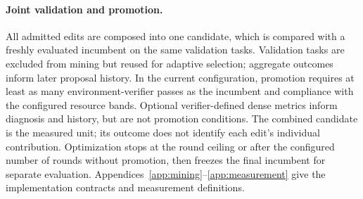 \paragraph{Joint validation and promotion.}
All admitted edits are composed into one candidate, which is compared with a
freshly evaluated incumbent on the same validation tasks. Validation tasks are
excluded from mining but reused for adaptive selection; aggregate outcomes
inform later proposal history. In the current configuration, promotion requires
at least as many environment-verifier passes as the incumbent and compliance
with the configured resource bands. Optional verifier-defined dense metrics
inform diagnosis and history, but are not promotion conditions. The combined
candidate is the measured unit; its outcome does not identify each edit's
individual contribution. Optimization stops at the round ceiling or after the
configured number of rounds without promotion, then freezes the final incumbent
for separate evaluation. Appendices~\ref{app:mining}--\ref{app:measurement}
give the implementation contracts and measurement definitions.
